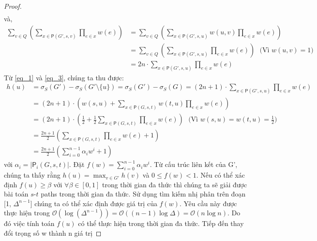 \begin{proof}
\begin{align}
	\label{eq_1}
	\end{align}  
	và, 
	\begin{align}
	\sum_{v \in  Q } \left(  \sum_{x \in \mathsf{P}(G', s, v)} \prod_{e \in x}w(e)  \right) &= \sum_{v \in Q} \left(  \sum_{x \in \mathsf{P}(G', s, u)} w(u, v)  \prod_{e \in x}w(e)  \right) \nonumber
	\\
	& =\sum_{v \in Q} \left(  \sum_{x \in \mathsf{P}(G', s, u)} \prod_{e \in x}w(e)  \right)\ \ \ \mbox{(Vì $w(u, v)=1$)} \nonumber
	\\
	& = 2n \cdot \sum_{x \in \mathsf{P}(G', s, u)} \prod_{e \in x}w(e)
	\label{eq_3}
	\end{align}
	Từ \eqref{eq_1} và \eqref{eq_3}, chúng ta thu được:
	\begin{align}
	h(u)&= \sigma_{S}(G')- \sigma_{S}(G'\setminus \{u\})=  \sigma_{S}(G')- \sigma_{S}(G)=(2n+1)\cdot \sum_{x \in \mathsf{P}(G', s, u)} \prod_{e \in x}w(e)
	\\
	& = (2n+1)\cdot \left(  w(s, u)+ \sum_{x \in \mathsf{P}(G, s, t)} w(t, u) \prod_{e \in x}w(e) \right) 
	\\
	& = (2n+1)\cdot \left(  \frac{1}{2}+ \frac{1}{2} \sum_{x \in \mathsf{P}(G, s, t)}  \prod_{e \in x}w(e) \right)  \ \ \ \mbox{(Vì $w(s, u)= w(t, u)=\frac{1}{2}$)}
	\\
	& = \frac{2n+1}{2} \left(  \sum_{x \in \mathsf{P}(G, s, t)}  \prod_{e \in x}w(e) +1 \right) 
	\\
	& = \frac{2n+1}{2} \left(  \sum_{i=0}^{n-1} \alpha_i w^i +1 \right) 
	\end{align}   		
	với $\alpha_i=|\mathsf{P}_i(G, s, t)|$. Đặt $f(w)=\sum_{i=0}^{n-1}\alpha_i w^i$. Từ cấu trúc liên kết của G', chúng ta thấy rằng $h(u)=\max_{v \in G'}h(v)$ và $0 \leq  f(w) < 1$. Nếu có thể xác định $f(u) \geq \beta$ với $\forall \beta \in [0, 1]$ trong thời gian đa thức thì chúng ta sẽ giải được bài toán $s$-$t$ paths trong thời gian đa thức. Sử dụng tìm kiếm nhị phân trên đoạn [1, $\Delta^{n-1}$] chúng ta có thể xác định được giá trị của $f(w)$. Yêu cầu này được thực hiện trong $\mathcal{O}(\log(\Delta^{n-1}))=\mathcal{O}((n-1)\log\Delta) =\mathcal{O}(n\log n)$. Do đó việc tính toán $f(u)$ có thể thực hiện trong thời gian đa thức. Tiếp đến thay đổi trọng số w thành n giá trị 
\end{proof}
